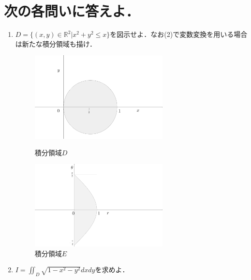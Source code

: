 \documentclass[a4paper,10pt]{jarticle}
\begin{document}
\newpage
\section{次の各問いに答えよ．}
\begin{enumerate}
\item $ D=\{(x,y) \in \mathbb{R}^2 | x^2+y^2 \leq x\}$を図示せよ．なお(2)で変数変換を用いる場合は新たな積分領域も描け．
\begin{figure}[h]\begin{minipage}{0.5\hsize}
	\begin{center}
		\includegraphics[width=70mm,bb  = 0 0 300 200]{41.png}
	\end{center}
 	\caption{積分領域$D$}
\end{minipage}
\begin{minipage}{0.5\hsize}
	\begin{center}
		\includegraphics[width=70mm,bb  = 0 0 300 200]{42.png}
	\end{center}
	\caption{積分領域$E$}
\end{minipage}
\end{figure}
\item$ I=\iint_{D} \sqrt{1-x^2-y^2}dxdy$を求めよ．


\end{enumerate}
\end{document}

